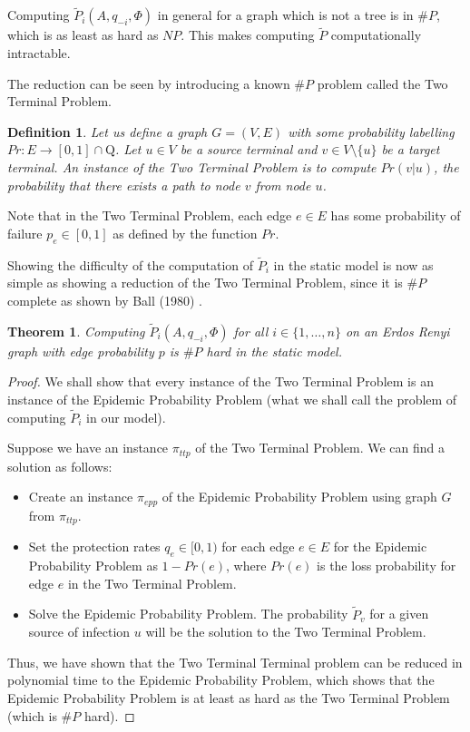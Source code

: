 \documentclass{article}
\theoremstyle{plain}
\newtheorem{definition}{Definition}
\newtheorem{theorem}{Theorem}
\begin{document}
Computing $\tilde{P}_i(A, q_{-i}, \Phi)$ in general for a graph which is not a tree is in $\# P$, which is as least as hard as $NP$. This makes computing $\tilde{P}$ computationally intractable.

The reduction can be seen by introducing a known $\# P$ problem called the Two Terminal Problem.

\begin{definition}
  Let us define a graph $G = (V, E)$ with some probability labelling $Pr: E \to [0,1] \cap \mathrm{Q}$. Let $u \in V$ be a source terminal and $v \in V \setminus \{u\}$ be a target terminal. An instance of the \emph{Two Terminal Problem} is to compute $Pr(v | u)$, the probability that there exists a path to node $v$ from node $u$.
\end{definition}

Note that in the Two Terminal Problem, each edge $e \in E$ has some probability of failure $p_e \in [0,1]$ as defined by the function $Pr$.

Showing the difficulty of the computation of $\tilde{P}_i$ in the static model is now as simple as showing a reduction of the Two Terminal Problem, since it is $\# P$ complete as shown by Ball (1980) \cite{ball80}.

\begin{theorem}
  Computing $\tilde{P}_i(A, q_{-i}, \Phi)$ for all $i \in \{1, \ldots, n\}$ on an Erdos Renyi graph with edge probability $p$ is $\# P$ hard in the static model.
\end{theorem}
\begin{proof}
  We shall show that every instance of the Two Terminal Problem is an instance of the Epidemic Probability Problem (what we shall call the problem of computing $\tilde{P}_i$ in our model).

  Suppose we have an instance $\pi_{ttp}$ of the Two Terminal Problem. We can find a solution as follows:
  \begin{itemize}
    \item Create an instance $\pi_{epp}$ of the Epidemic Probability Problem using graph $G$ from $\pi_{ttp}$.
    \item Set the protection rates $q_e \in [0,1)$ for each edge $e \in E$ for the Epidemic Probability Problem as $1 - Pr(e)$, where $Pr(e)$ is the loss probability for edge $e$ in the Two Terminal Problem.
    \item Solve the Epidemic Probability Problem. The probability $\tilde{P}_v$ for a given source of infection $u$ will be the solution to the Two Terminal Problem.
  \end{itemize}

  Thus, we have shown that the Two Terminal Terminal problem can be reduced in polynomial time to the Epidemic Probability Problem, which shows that the Epidemic Probability Problem is at least as hard as the Two Terminal Problem (which is $\# P$ hard).
\end{proof}
\end{document}
